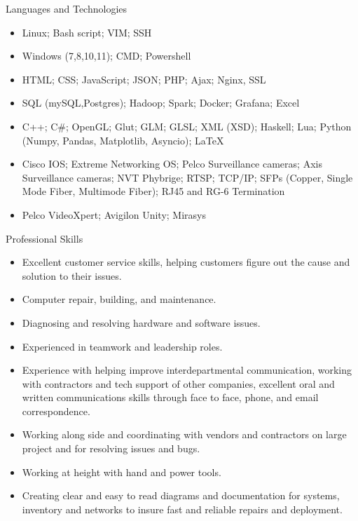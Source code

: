 \documentclass[]{mcdowellcvcustom}
\begin{document}
	\begin{cvsection}{Languages and Technologies}
		\begin{cvsubsection}{}{}{}	
			\begin{itemize}
				\item Linux; Bash script; VIM; SSH
				\item Windows (7,8,10,11); CMD; Powershell
				\item HTML; CSS; JavaScript; JSON; PHP; Ajax; Nginx, SSL
				\item SQL (mySQL,Postgres); Hadoop; Spark; Docker; Grafana; Excel
				\item C++; C\#; OpenGL; Glut; GLM; GLSL; XML (XSD); Haskell; Lua; Python (Numpy, Pandas, Matplotlib, Asyncio); \LaTeX  
				\item Cisco IOS; Extreme Networking OS; Pelco Surveillance cameras; Axis Surveillance cameras; NVT Phybrige; RTSP; TCP/IP; SFPs (Copper, Single Mode Fiber, Multimode Fiber); RJ45 and RG-6 Termination
				\item Pelco VideoXpert; Avigilon Unity; Mirasys
			\end{itemize}
		\end{cvsubsection}
	\end{cvsection}
	
		\begin{cvsection}{Professional Skills}
		\begin{cvsubsection}{}{}{}	
			\begin{itemize}
				\item Excellent customer service skills, helping customers figure out the cause and solution to their issues.
				\item Computer repair, building, and maintenance.
				\item Diagnosing and resolving hardware and software issues.
				\item Experienced in teamwork and leadership roles.
				\item Experience with helping improve interdepartmental communication, working with contractors and tech support of other companies, excellent oral and written communications skills through face to face, phone, and email correspondence. 
				\item Working along side and coordinating with vendors and contractors on large project and for resolving issues and bugs.
				\item Working at height with hand and power tools.
				\item Creating clear and easy to read diagrams and documentation for systems, inventory and networks to insure fast and reliable repairs and deployment.
			\end{itemize}
		\end{cvsubsection}
	\end{cvsection}
	
\end{document}
